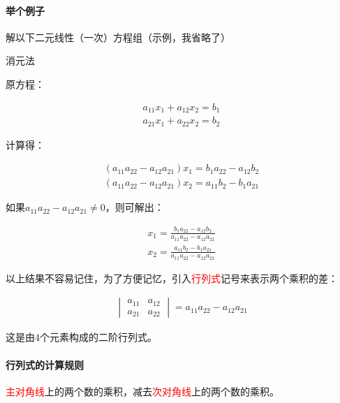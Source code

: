 \documentclass[UTF8]{ctexbook}
\begin{document}
\paragraph{举个例子}解以下二元线性（一次）方程组（示例，我省略了）

消元法

原方程：

\begin{equation}
\begin{aligned}
a_{11}x_{1}+a_{12}x_{2}=b_{1} \\
a_{21}x_{1}+a_{22}x_{2}=b_{2}
\end{aligned}
\end{equation}

计算得：

\begin{equation}
\begin{aligned}
(a_{11}a_{22}-a_{12}a_{21})x_{1}=b_{1}a_{22}-a_{12}b_{2}\\
(a_{11}a_{22}-a_{12}a_{21})x_{2}=a_{11}b_{2}-b_{1}a_{21}
\end{aligned}
\end{equation}

如果$a_{11}a_{22}-a_{12}a_{21} \neq 0$，则可解出：

\begin{equation}
\begin{aligned}
x_{1}=\frac{b_{1}a_{22}-a_{12}b_{2}}{a_{11}a_{22}-a_{12}a_{21}}\\
x_{2}=\frac{a_{11}b_{2}-b_{1}a_{21}}{a_{11}a_{22}-a_{12}a_{21}}
\end{aligned}
\end{equation}

以上结果不容易记住，为了方便记忆，引入\textcolor{red}{行列式}记号来表示两个乘积的差：

\begin{equation}
\begin{aligned}
\begin{vmatrix} a_{11} & a_{12} \\ a_{21} & a_{22} \end{vmatrix}
=a_{11}a_{22}-a_{12}a_{21}
\end{aligned}
\end{equation}

这是由4个元素构成的二阶行列式。

\paragraph{行列式的计算规则} \textcolor{red}{主对角线}上的两个数的乘积，减去\textcolor{red}{次对角线}上的两个数的乘积。
\end{document}
